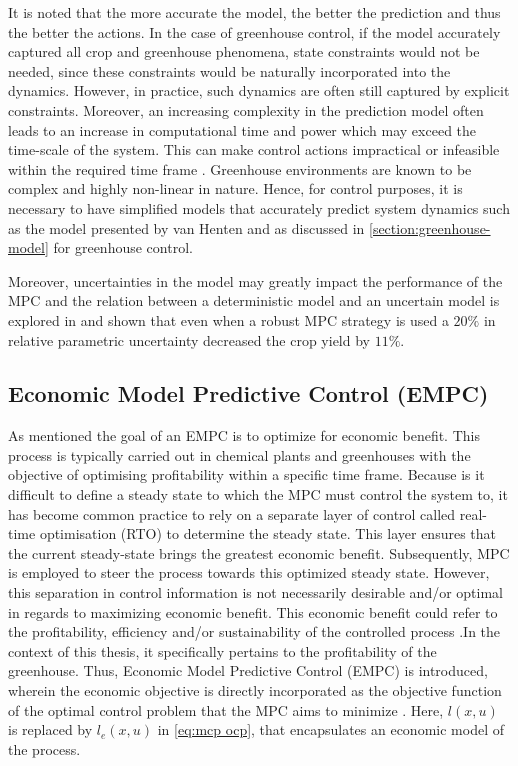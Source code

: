 It is noted that the more accurate the model, the better the prediction and thus the better the actions. In the case of greenhouse control, if the model accurately captured all crop and greenhouse phenomena, state constraints would not be needed, since these constraints would be naturally incorporated into the dynamics. However, in practice, such dynamics are often still captured by explicit constraints. Moreover, an increasing complexity in the prediction model often leads to an increase in computational time and power which may exceed the time-scale of the system. This can make control actions impractical or infeasible within the required time frame \cite{rawlingsModelPredictiveControl2017}. Greenhouse environments are known to be complex and highly non-linear in nature. Hence, for control purposes,  it is necessary to have simplified models that accurately predict system dynamics such as the model presented by van Henten \cite{hentenGreenhouseClimateManagement1994} and as discussed in \autoref{section:greenhouse-model} for greenhouse control. 

Moreover, uncertainties in the model may greatly impact the performance of the MPC and the relation between a deterministic model and an uncertain model is explored in \cite{boersmaRobustSamplebasedModel2022} and shown that even when a robust MPC strategy is used a $20\%$ in relative parametric uncertainty decreased the crop yield by $11\%$.

\subsection{Economic Model Predictive Control (EMPC)}
As mentioned the goal of an EMPC is to optimize for economic benefit. This process is typically carried out in chemical plants and greenhouses with the objective of optimising profitability within a specific time frame. Because is it difficult to define a steady state to which the MPC must control the system to, it has become common practice to rely on a separate layer of control called real-time optimisation (RTO) to determine the steady state. This layer ensures that the current steady-state brings the greatest economic benefit. Subsequently, MPC is employed to steer the process towards this optimized steady state. However, this separation in control information is not necessarily desirable and/or optimal in regards to maximizing economic benefit. This economic benefit could refer to the profitability, efficiency and/or sustainability of the controlled process \cite{ellisTutorialReviewEconomic2014}.In the context of this thesis, it specifically pertains to the profitability of the greenhouse. Thus, Economic Model Predictive Control (EMPC) is introduced, wherein the economic objective is directly incorporated as the objective function of the optimal control problem that the MPC aims to minimize \cite{rawlingsFundamentalsEconomicModel2012}. Here, $l(x,u)$ is replaced by $l_e(x,u)$ in \autoref{eq:mcp ocp}, 
that encapsulates an economic model of the process.

